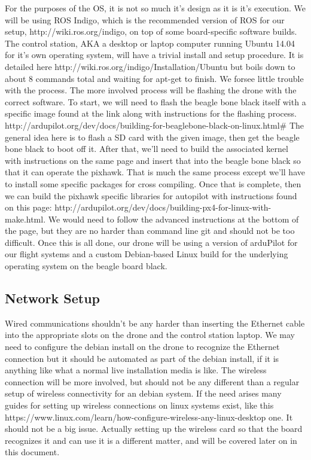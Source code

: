 \documentclass[IEEEtran,letterpaper,10pt,titlepage,draftclsnofoot,onecolumn]{article}
\begin{document}
For the purposes of the OS, it is not so much it's design as it is it's execution.
We will be using ROS Indigo, which is the recommended version of ROS for our setup, http://wiki.ros.org/indigo,
on top of some board-specific software builds.
The control station, AKA a desktop or laptop computer running Ubuntu 14.04 for it's own operating system, will have a trivial
install and setup procedure. It is detailed here http://wiki.ros.org/indigo/Installation/Ubuntu but boils down to about 8 
commands total and waiting for apt-get to finish. We forsee little trouble with the process.
The more involved process will be flashing the drone with the correct software. To start, we will need to flash the beagle
bone black itself with a specific image found at the link along with instructions for the flashing process.
http://ardupilot.org/dev/docs/building-for-beaglebone-black-on-linux.html# 
The general idea here is to flash a SD card with the given image, then get the beagle bone black to boot off it. After that,
we'll need to build the associated kernel with instructions on the same page and insert that into the beagle bone black
so that it can operate the pixhawk. That is much the same process except we'll have to install some specific packages 
for cross compiling. Once that is complete, then we can build the pixhawk specific libraries for autopilot with instructions
found on this page: http://ardupilot.org/dev/docs/building-px4-for-linux-with-make.html. We would need to follow the 
advanced instructions at the bottom of the page, but they are no harder than command line git and should not be too difficult.
Once this is all done, our drone will be using a version of arduPilot for our flight systems and a custom Debian-based Linux 
build for the underlying operating system on the beagle board black.

\subsection*{Network Setup}

Wired communications shouldn't be any harder than inserting the Ethernet cable into the appropriate slots on the drone and the control station laptop. We may need to configure the debian install on the drone to recognize the Ethernet connection but it 
should be automated as part of the debian install, if it is anything like what a normal live installation media is like.
The wireless connection will be more involved, but should not be any different than a regular setup of wireless connectivity
for an debian system. If the need arises many guides for setting up wireless connections on linux systems exist, like this
https://www.linux.com/learn/how-configure-wireless-any-linux-desktop one. It should not be a big issue.
Actually setting up the wireless card so that the board recognizes it and can use it is a different matter, and will be covered
later on in this document.
\end{document}
